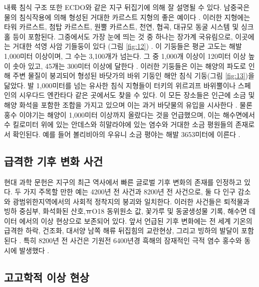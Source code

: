 \documentclass[10pt,twocolumn,letterpaper]{article}
\begin{document}
내륙 침식 구조 또한 ECDO와 같은 지구 뒤집기에 의해 잘 설명될 수 있다. 남중국은 물의 침식작용에 의해 형성된 거대한 카르스트 지형의 좋은 예이다 \cite{82}. 이러한 지형에는 타워 카르스트, 첨탑 카르스트, 원뿔 카르스트, 천연, 협곡, 대규모 동굴 시스템 및 싱크홀 등이 포함된다. 그중에서도 가장 눈에 띄는 것 중 하나는 장가계 국유림으로, 이곳에는 거대한 석영 사암 기들둥이 있다 (그림 \ref{fig:12}) \cite{84}. 이 기둥들은 평균 고도는 해발 1,000미터 이상이며, 그 수는 3,100개가 넘는다. 그 중 1,000개 이상이 120미터 이상 높이 솟아 있고, 45개는 300미터 이상에 달한다 \cite{85}. 이러한 기둥들은 이는 해양의 파도로 인해 주변 물질이 붕괴되어 형성된 바닷가의 바위 기둥인 해안 침식 기둥(그림 \ref{fig:13})을 닮았다. 발 1,000미터를 넘는 유사한 침식 지형들이 터키의 위르괴프 바위뿔이나 스페인의 시우다드 엔칸타다 같은 곳에서도 찾을 수 있다. 이 모든 장소들은 인근에 소금 및 해양 화석을 포함한 조합을 가지고 있으며 이는 과거 바닷물의 유입을 시사한다 \cite{15,86,87}. 물론 홍수 이야기는 \cite{3} 해양이 1,000미터 이상까지 올랐다는 것을 언급했으며, 이는 해수면에서 수 킬로미터 위에 있는 안데스와 히말라야에 있는 염수와 거대한 소금 평원들의 존재로서 확인된다. 예를 들어 볼리비아의 우유니 소금 평야는 해발 3653미터에 이른다 \cite{94}.

\subsection{급격한 기후 변화 사건}

현대 과학 문헌은 지구의 최근 역사에서 빠른 글로벌 기후 변화의 존재를 인정하고 있다. 두 가지 주목할 만한 예는 4200년 전 사건과 8200년 전 사건으로, 둘 다 인구 감소와 광범위한지역에서의 사회적 정착지의 붕괴와 일치한다. 이러한 사건들은 퇴적물과 빙하 중심부, 화석화된 산호,ㅠO18 동위원소 값, 꽃가루 및 동굴생성물 기록, 해수면 데이터 에서의 이상 현상으로 보존되어 있다. 앞서 언급된 기후 변화에는 전 세계 기온의 급격한 하락, 건조화, 대서양 남쪽 해류 뒤집힘의 교란현상, 그리고 빙하의 발달이 포함된다 \cite{90,91,92}. 특히 8200년 전 사건은 기원전 6400년경 흑해의 잠재적인 극적 염수 홍수와 동시에 발생했다 \cite{93}.

\subsection{고고학적 이상 현상}
\end{document}
